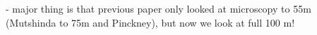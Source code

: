 \documentclass[draft]{agujournal2019}
\begin{document}
- major thing is that previous paper only looked at microscopy to 55m (Mutshinda to 75m and Pinckney), but now we look at full 100 m!
\end{document}

